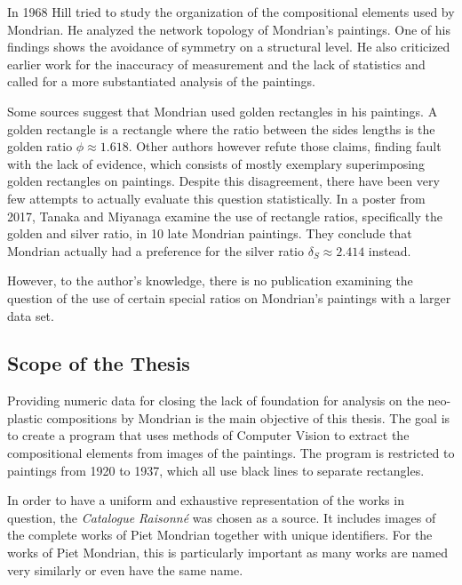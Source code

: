 \documentclass[serif,article,noparskip]{agse-thesis}
\begin{document}
In 1968 Hill \cite{Hill1968} tried to study the organization of the compositional
elements used by Mondrian. He analyzed the network topology of Mondrian's
paintings. One of his findings shows the avoidance of symmetry on a structural
level. He also criticized earlier work for the inaccuracy of measurement and the
lack of statistics and called for a more substantiated analysis of the
paintings.

Some sources \cite{bouleau1963,bergamini1980} suggest that Mondrian used golden
rectangles in his paintings. A golden rectangle is a rectangle where the ratio
between the sides lengths is the golden ratio $\phi \approx 1.618$. Other authors
 \cite{Livio2002,Markowsky1992} however refute those claims, finding fault with
the lack of evidence, which consists of mostly exemplary superimposing golden
rectangles on paintings. Despite this disagreement, there have been very few
attempts to actually evaluate this question statistically. In a poster from
2017, Tanaka and Miyanaga \cite{Tanaka2017} examine the use of rectangle ratios,
specifically the golden and silver ratio, in 10 late Mondrian paintings. They
conclude that Mondrian actually had a preference for the silver ratio $\delta_S
\approx 2.414$ instead.

However, to the author's knowledge, there is no publication examining the question of
the use of certain special ratios on Mondrian's paintings with a larger data
set.

\subsection{Scope of the Thesis}

Providing numeric data for closing the lack of foundation for analysis on the
neo-plastic compositions by Mondrian is the main objective of this thesis. The
goal is to create a program that uses methods of Computer Vision to extract the
compositional elements from images of the paintings. The program is restricted
to paintings from 1920 to 1937, which all use black lines to separate rectangles.

In order to have a uniform and exhaustive representation of the works in
question, the \textit{Catalogue Raisonn{\'e}} \cite{joosten1998} was chosen as a
source. It includes images of the complete works of Piet Mondrian together with
unique identifiers. For the works of  Piet Mondrian, this is particularly
important as many works are named very similarly or even have the same name.
\end{document}
